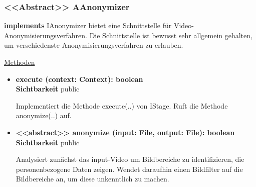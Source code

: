 \subsubsection{<<Abstract>> AAnonymizer} \label{service:klasse:AAnonymizer}
\textbf{implements}  \newline
IAnonymizer bietet eine Schnittstelle für Video-Anonymisierungsverfahren. Die Schnittstelle ist bewusst sehr allgemein gehalten, um verschiedenste Anonymisierungsverfahren zu erlauben. \newline

\underline{Methoden}
\begin{itemize}
\itemsep0pt
\item \textbf{execute (context: Context): boolean}\hfill\\
\textbf{Sichtbarkeit} public

Implementiert die Methode execute(..) von IStage. Ruft die Methode anonymize(..) auf.

\item \textbf{<<abstract>> anonymize (input: File, output: File): boolean}\hfill\\
\textbf{Sichtbarkeit} public

Analysiert zunächst das input-Video um Bildbereiche zu identifizieren, die personenbezogene Daten zeigen. Wendet daraufhin einen Bildfilter auf die Bildbereiche an, um diese unkenntlich zu machen.

\end{itemize}